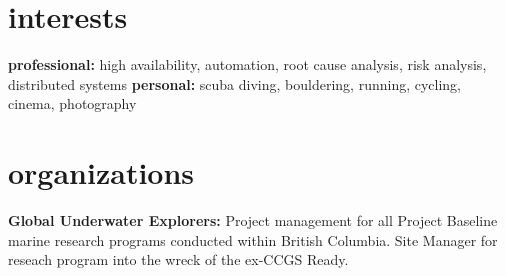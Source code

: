 \documentclass[]{friggeri-cv} %
\begin{document}

\section{interests}

\textbf{professional:} high availability, automation, root cause analysis, risk analysis, distributed systems \textbf{personal:} scuba diving, bouldering, running, cycling, cinema, photography


\section{organizations}

\textbf{Global Underwater Explorers:} Project management for all Project Baseline marine research programs conducted within British Columbia. Site Manager for reseach program into the wreck of the ex-CCGS Ready.










\end{document}
